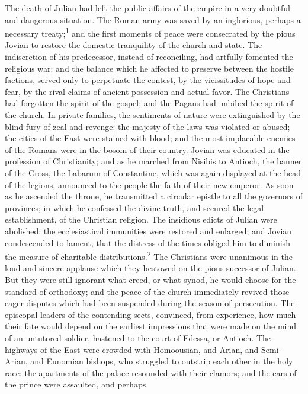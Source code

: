The death of Julian had left the public affairs of the empire in
a very doubtful and dangerous situation. The Roman army was saved
by an inglorious, perhaps a necessary treaty;\textsuperscript{1} and the first
moments of peace were consecrated by the pious Jovian to restore
the domestic tranquility of the church and state. The
indiscretion of his predecessor, instead of reconciling, had
artfully fomented the religious war: and the balance which he
affected to preserve between the hostile factions, served only to
perpetuate the contest, by the vicissitudes of hope and fear, by
the rival claims of ancient possession and actual favor. The
Christians had forgotten the spirit of the gospel; and the Pagans
had imbibed the spirit of the church. In private families, the
sentiments of nature were extinguished by the blind fury of zeal
and revenge: the majesty of the laws was violated or abused; the
cities of the East were stained with blood; and the most
implacable enemies of the Romans were in the bosom of their
country. Jovian was educated in the profession of Christianity;
and as he marched from Nisibis to Antioch, the banner of the
Cross, the Labarum of Constantine, which was again displayed at
the head of the legions, announced to the people the faith of
their new emperor. As soon as he ascended the throne, he
transmitted a circular epistle to all the governors of provinces;
in which he confessed the divine truth, and secured the legal
establishment, of the Christian religion. The insidious edicts of
Julian were abolished; the ecclesiastical immunities were
restored and enlarged; and Jovian condescended to lament, that
the distress of the times obliged him to diminish the measure of
charitable distributions.\textsuperscript{2} The Christians were unanimous in the
loud and sincere applause which they bestowed on the pious
successor of Julian. But they were still ignorant what creed, or
what synod, he would choose for the standard of orthodoxy; and
the peace of the church immediately revived those eager disputes
which had been suspended during the season of persecution. The
episcopal leaders of the contending sects, convinced, from
experience, how much their fate would depend on the earliest
impressions that were made on the mind of an untutored soldier,
hastened to the court of Edessa, or Antioch. The highways of the
East were crowded with Homoousian, and Arian, and Semi-Arian, and
Eunomian bishops, who struggled to outstrip each other in the
holy race: the apartments of the palace resounded with their
clamors; and the ears of the prince were assaulted, and perhaps
